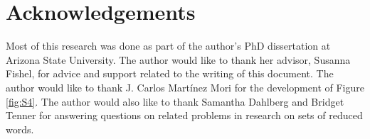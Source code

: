 \documentclass[11pt,reqno]{amsart}
\theoremstyle{definition}
\theoremstyle{notation}
\begin{document}
\section*{Acknowledgements}

Most of this research was done as part of the author's PhD dissertation at Arizona State University. The author would like to thank her advisor, Susanna Fishel, for advice and support related to the writing of this document. The author would like to thank J. Carlos Mart\'inez Mori for the development of Figure \ref{fig:S4}. The author would also like to thank Samantha Dahlberg and Bridget Tenner for answering questions on related problems in research on sets of reduced words.



\end{document}
